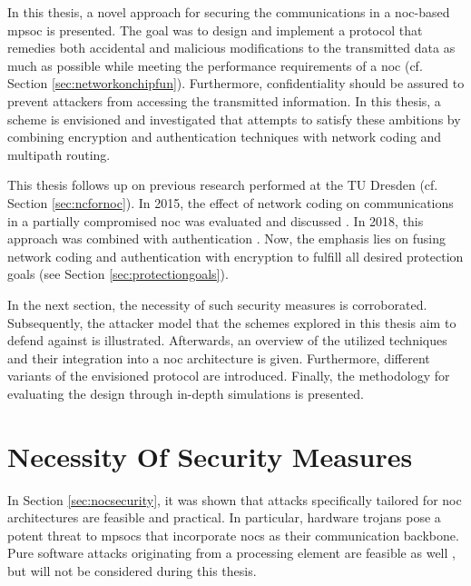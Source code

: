In this thesis, a novel approach for securing the communications in a \gls{noc}-based \gls{mpsoc} is presented. The goal was to design and implement a protocol that
remedies both accidental and malicious modifications to the transmitted data as much as possible while meeting the performance requirements of a \gls{noc} (cf. Section
\ref{sec:networkonchipfun}). Furthermore, confidentiality should be assured to prevent attackers from accessing the transmitted information. In this
thesis, a scheme is envisioned and investigated that attempts to satisfy these ambitions by combining encryption and authentication techniques with
network coding and multipath routing.

This thesis follows up on previous research performed at the TU Dresden (cf. Section \ref{sec:ncfornoc}). In 2015, the effect of network coding on
communications in a partially compromised \gls{noc} was evaluated and discussed \cite{moriam15manycorenc}. In 2018, this approach was combined with
authentication \cite{moriam18activeattackers}. Now, the emphasis lies on fusing network coding and authentication with encryption to fulfill all
desired protection goals (see Section \ref{sec:protectiongoals}).

In the next section, the necessity of such security measures is corroborated. Subsequently, the attacker model that the schemes explored in this
thesis aim to defend against is illustrated. Afterwards, an overview of the utilized techniques and their integration
into a \gls{noc} architecture is given. Furthermore, different variants of the envisioned protocol are introduced. Finally, the
methodology for evaluating the design through in-depth simulations is presented.

\section{Necessity Of Security Measures}\label{sec:necessityofsecurity}
In Section \ref{sec:nocsecurity}, it was shown that attacks specifically tailored for \gls{noc} architectures are feasible and practical. In
particular, hardware trojans pose a potent threat to \glspl{mpsoc} that incorporate \glspl{noc} as their communication backbone. Pure software attacks
originating from a processing element are feasible as well \cites(e.g.)(){biswas15routerattack}{kocher04embeddedsecurity}, but will not be considered
during this thesis. %

